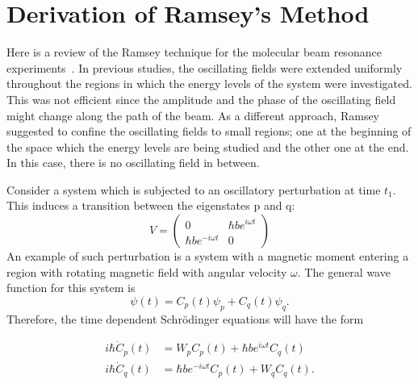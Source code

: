 \chapter{Derivation of Ramsey's Method\label{app:ramsey}}
Here is a review of the Ramsey technique for the molecular beam
resonance experiments~\cite{NMR_Notes}. In previous studies, the
oscillating fields were extended uniformly throughout the regions in
which the energy levels of the system were investigated.  This was not
efficient since the amplitude and the phase of the oscillating field
might change along the path of the beam. As a different approach,
Ramsey suggested to confine the oscillating fields to small regions;
one at the beginning of the space which the energy levels are being
studied and the other one at the end. In this case, there is no
oscillating field in between.

Consider a system which is subjected to an oscillatory perturbation at
time $t_1$. This induces a transition between the eigenstates p and q:
\begin{equation}
V=
\left(
\begin{array}{cc}
0 & \hbar b e^{i\omega t} \\ 
\hbar b e^{-i \omega t} & 0
\end{array} 
\right)
\end{equation}
An example of such perturbation is a system with a magnetic moment
entering a region with rotating magnetic field with angular velocity
$\omega$. The general wave function for this system is
\begin{equation}
\psi(t)= C_p (t) \psi_p + C_q(t) \psi_q.
\end{equation}
Therefore, the time dependent Schr\"{o}dinger equations will have the
form

\begin{align}
 \label{eqn:cp}
  i \hbar \dot{C}_p(t)&= W_p C_p(t)+\hbar b e^{i \omega t} C_q(t) \\
   \label{eqn:cq}
i \hbar \dot{C}_q(t)&=\hbar b e^{-i \omega t} C_p(t) +W_q C_q(t).
\end{align}

